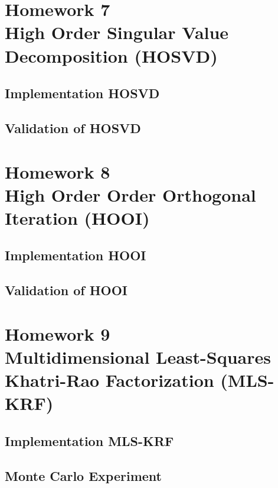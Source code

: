 \documentclass[a4paper,10pt]{article}
\begin{document}
\newpage
\section*{Homework 7 \\ High Order Singular Value Decomposition (HOSVD)}

    \subsection*{Implementation HOSVD}

    \subsection*{Validation of HOSVD}

\newpage
\section*{Homework 8 \\ High Order Order Orthogonal Iteration (HOOI)}

    \subsection*{Implementation HOOI}

    \subsection*{Validation of HOOI}

\newpage
\section*{Homework 9 \\ Multidimensional Least-Squares Khatri-Rao Factorization
(MLS-KRF)}

    \subsection*{Implementation MLS-KRF}

    \subsection*{Monte Carlo Experiment}
\end{document}
